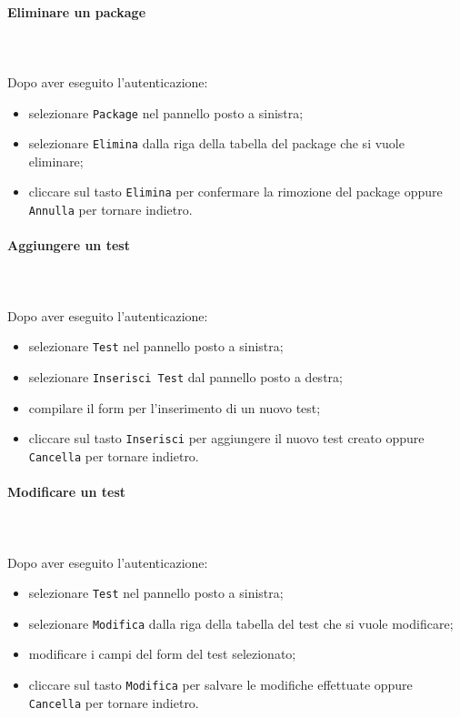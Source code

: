 \paragraph{Eliminare un package} \mbox{}\\ \mbox{}\\
Dopo aver eseguito l'autenticazione:
\begin{itemize}
	\item selezionare \texttt{Package} nel pannello posto a sinistra;
	\item selezionare \texttt{Elimina} dalla riga della tabella del package 
		che si vuole eliminare;\
	\item cliccare sul tasto \texttt{Elimina} per confermare la rimozione del package
		oppure \texttt{Annulla} per tornare indietro.
\end{itemize}

\paragraph{Aggiungere un test} \mbox{}\\ \mbox{}\\
Dopo aver eseguito l'autenticazione:
\begin{itemize}
	\item selezionare \texttt{Test} nel pannello posto a sinistra;
	\item selezionare \texttt{Inserisci Test} dal pannello posto a destra;
	\item compilare il form per l'inserimento di un nuovo test;
	\item cliccare sul tasto \texttt{Inserisci} per aggiungere il nuovo test
		creato oppure \texttt{Cancella} per tornare indietro.	
\end{itemize}

\paragraph{Modificare un test} \mbox{}\\ \mbox{}\\
Dopo aver eseguito l'autenticazione:
\begin{itemize}
	\item selezionare \texttt{Test} nel pannello posto a sinistra;
	\item selezionare \texttt{Modifica} dalla riga della tabella del test
		che si vuole modificare;
	\item modificare i campi del form del test selezionato;
	\item cliccare sul tasto \texttt{Modifica} per salvare le modifiche effettuate
		oppure \texttt{Cancella} per tornare indietro.
\end{itemize}

